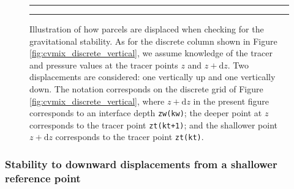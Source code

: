 \begin{figure}
\rule{\textwidth}{0.005in}
\begin{center}
\caption[Parcel displacements for gravitational stability calculation]
{Illustration of how parcels are displaced when checking for the
  gravitational stability. As for the discrete column shown in Figure
  \ref{fig:cvmix_discrete_vertical}, we assume knowledge of the tracer
  and pressure values at the tracer points $z$ and
  $z+\mathrm{d}z$. Two displacements are considered: one vertically up
  and one vertically down.  The notation corresponds on the discrete
  grid of Figure \ref{fig:cvmix_discrete_vertical}, where
  $z+\mathrm{d}z$ in the present figure corresponds to an interface
  depth {\tt zw(kw)}; the deeper point at $z$ corresponds to the
  tracer point {\tt zt(kt+1)}; and the shallower point $z+\mathrm{d}z$
  corresponds to the tracer point {\tt zt(kt)}.}
\label{fig:cvmix_stability}
\end{center}
\rule{\textwidth}{0.005in}
\end{figure}


\subsubsection{Stability to downward displacements from a shallower reference point}

